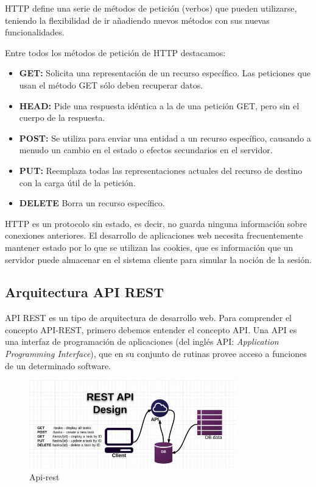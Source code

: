 HTTP define una serie de métodos de petición (verbos) que pueden utilizarse, teniendo la flexibilidad de ir añadiendo nuevos métodos con sus nuevas funcionalidades.

Entre todos los métodos de petición de HTTP destacamos:
\begin{itemize}
    \item \textbf {GET:} Solicita una representación de un recurso específico. Las peticiones que usan el método GET sólo deben recuperar datos.
    \item \textbf {HEAD:} Pide una respuesta idéntica a la de una petición GET, pero sin el cuerpo de la respuesta.
    \item \textbf {POST:} Se utiliza para enviar una entidad a un recurso específico, causando a menudo un cambio en el estado o efectos secundarios en el servidor.
    \item \textbf {PUT:} Reemplaza todas las representaciones actuales del recurso de destino con la carga útil de la petición.
    \item \textbf {DELETE} Borra un recurso específico.
\end{itemize}

HTTP es un protocolo sin estado, es decir, no guarda ninguna información sobre conexiones anteriores. El desarrollo de aplicaciones web necesita frecuentemente mantener estado por lo que se utilizan las cookies, que es información que un servidor puede almacenar en el sistema cliente para simular la noción de la sesión.

\subsection{Arquitectura API REST}

API REST es un tipo de arquitectura de desarrollo web. Para comprender el concepto API-REST, primero debemos entender el concepto API. Una API es una interfaz de programación de aplicaciones (del inglés API: \textit{Application Programming Interface}), que en su conjunto de rutinas provee acceso a funciones de un determinado software.


\begin{figure}[!h]
\centering
\includegraphics[width=90mm]{img/introduccion/rest-api.jpg}
\caption{Api-rest}
\end{figure}


